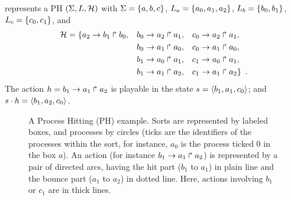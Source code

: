 \begin{example}
 represents a PH $(\Sigma,L,\mathcal{H})$ with
$\Sigma = \{a,b,c\}$,
$L_a = \{a_0,a_1,a_2\}$,
$L_b = \{b_0, b_1\}$,
$L_c = \{c_0, c_1\}$, and
\begin{align*}
\mathcal{H} & = \{
	a_2\rightarrow b_1\Rsh b_0,
&&  b_0\rightarrow a_2\Rsh a_1,
&&	c_0\rightarrow a_2\Rsh a_1,\\
&&& b_0\rightarrow a_1\Rsh a_0,
&&	c_0\rightarrow a_1\Rsh a_0,\\
&&& b_1\rightarrow a_0\Rsh a_1,
&&	c_1\rightarrow a_0\Rsh a_1,\\
&&& b_1\rightarrow a_1\Rsh a_2,
&&	c_1\rightarrow a_1\Rsh a_2 \}\enspace.
\end{align*}
The action $h=b_1\rightarrow a_1\Rsh a_2$ is playable in the state
$s = \langle b_1,a_1,c_0 \rangle$; and $s\cdot h=\langle b_1,a_2,c_0 \rangle$.

\begin{figure}[tb]
\centering
{}
\caption{\label{fig:runningPH-1}
A Process Hitting (PH) example.
Sorts are represented by labeled boxes, and processes by circles (ticks are
the identifiers of the processes within the sort, for instance, $a_0$ is the
process ticked $0$ in the box $a$).
An action (for instance $b_1\rightarrow a_1\Rsh a_2$) is represented by a pair of
directed arcs, having the hit part ($b_1$ to $a_1$) in plain line and the bounce
part ($a_1$ to $a_2$) in dotted line.
Here, actions involving $b_1$ or $c_1$ are in thick lines.
}
\end{figure}


\end{example}
